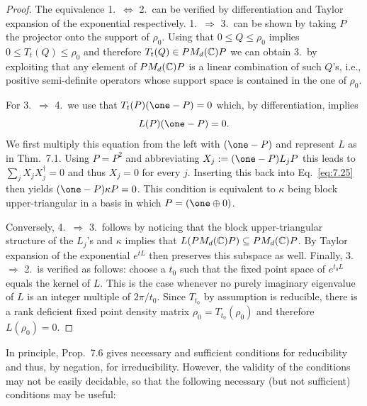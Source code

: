 \documentclass[11pt,a4paper]{article}
\theoremstyle{plain}
\begin{document}
\begin{proof}
    The equivalence 1.\ $\Leftrightarrow$ 2.\ can be verified by differentiation and Taylor expansion of the exponential respectively. 1.\ $\Rightarrow$ 3.\ can be shown by taking $P$ the projector onto the support of $\rho_0$. Using that $0\le Q\le \rho_0$ implies $0\le T_t(Q)\le \rho_0$ and therefore $T_t(Q)\in PM_d(\mathbb{C})P$ we can obtain 3.\ by exploiting that any element of $PM_d(\mathbb{C})P$ is a linear combination of such $Q$'s, i.e., positive semi-definite operators whose support space is contained in the one of $\rho_0$.

    For 3.\ $\Rightarrow$ 4.\ we use that $T_t(P)(\one-P)=0$ which, by differentiation, implies
    \begin{equation}\label{eq:7.25}
        L(P)(\one-P)=0.
    \end{equation}
    We first multiply this equation from the left with $(\one-P)$ and represent $L$ as in Thm.~7.1. Using $P=P^2$ and abbreviating $X_j:=(\one-P)L_jP$ this leads to $\sum_j X_jX_j^{\dagger}=0$ and thus $X_j=0$ for every $j$. Inserting this back into Eq.~\eqref{eq:7.25} then yields $(\one-P)\kappa P=0$. This condition is equivalent to $\kappa$ being block upper-triangular in a basis in which $P=(\one\oplus 0)$.

    Conversely, 4.\ $\Rightarrow$ 3.\ follows by noticing that the block upper-triangular structure of the $L_j$'s and $\kappa$ implies that
    $L(PM_d(\mathbb{C})P)\subseteq PM_d(\mathbb{C})P$. By Taylor expansion of the exponential $e^{tL}$ then preserves this subspace as well. Finally, 3.\ $\Rightarrow$ 2.\ is verified as follows: choose a $t_0$ such that the fixed point space of $e^{t_0L}$ equals the kernel of $L$. This is the case whenever no purely imaginary eigenvalue of $L$ is an integer multiple of $2\pi/t_0$. Since $T_{t_0}$ by assumption is reducible, there is a rank deficient fixed point density matrix $\rho_0=T_{t_0}(\rho_0)$ and therefore $L(\rho_0)=0$.
\end{proof}

In principle, Prop.~7.6 gives necessary and sufficient conditions for reducibility and thus, by negation, for irreducibility. However, the validity of the conditions may not be easily decidable, so that the following necessary (but not sufficient) conditions may be useful:
\end{document}
